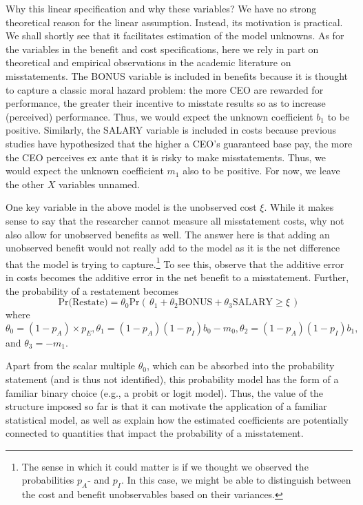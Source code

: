 Why this linear specification and why these variables? 
We have no strong theoretical reason for the linear assumption. 
Instead, its motivation is practical.
We shall shortly see that it facilitates estimation of the model unknowns.
As for the variables in the benefit and cost specifications, here we rely in part on theoretical and empirical observations in the academic literature on misstatements. 
The BONUS variable is included in benefits because it is thought to capture a classic moral hazard problem: the more CEO are rewarded for performance, the
greater their incentive to misstate results so as to increase (perceived) 
performance.
Thus, we would expect the unknown coefficient $b_1$ to be positive.
Similarly, the SALARY variable is included in costs because previous studies have hypothesized that the higher a CEO's guaranteed base pay, the more the CEO perceives ex ante that it is risky to make misstatements.
Thus, we would expect the unknown coefficient $m_1$ also to be positive. For now, we leave the other $X$ variables unnamed.

One key variable in the above model is the unobserved cost $\xi$.
While it makes sense to say that the researcher cannot measure all misstatement
costs, why not also allow for unobserved benefits as well.
The answer here is that adding an unobserved benefit would not really add to the model as it is the net difference that the model is trying to capture.\footnote{
The sense in which it could matter is if we thought we observed the probabilities
$p_A$- and $p_I$.
In this case, we might be able to distinguish between the cost and benefit unobservables based on their variances.}
To see this, observe that the additive error in costs becomes the additive error in the net benefit to a misstatement. 
Further, the probability of a restatement becomes
\begin{equation}\label{restate1}
\mbox{Pr(Restate)} = \theta_0 \mbox{Pr}\left(\, \theta_1 + \theta_2 \mbox{BONUS}
+ \theta_3 \mbox{SALARY}  \ge \xi \,\right)
\end{equation}
where $\theta_0=(1-p_A) \times p_{E}, \theta_1 = (1 - p_A)(1 - p_I) b_0 - m_0, 
\theta_2 = (1 - p_A)(1 - p_I) b_1,$ and $\theta_3 = - m_1.$ 

Apart from the scalar multiple $\theta_0$, which can be absorbed into the probability statement (and is thus not identified), this probability model has the form of  a familiar binary choice (e.g., a probit or logit model).
Thus, the value of the structure imposed so far is that it can motivate the application of a familiar statistical model, as  well as explain how the estimated coefficients are potentially connected to quantities that impact the probability of a misstatement.

